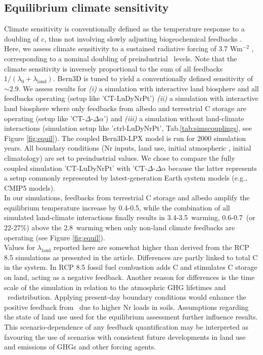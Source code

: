 \subsection{Equilibrium climate sensitivity}
\label{sec:equil}
Climate sensitivity is conventionally defined as the temperature response to a doubling of c\coo , thus not involving slowly adjusting biogeochemical feedbacks \citep{knuttihegerl08ngeo}. Here, we assess climate sensitivity to a sustained radiative forcing of 3.7 Wm$^{-2}$ , corresponding to a nominal doubling of preindustrial \coo\ levels. Note that the climate sensitivity is inversely proportional to the sum of all feedbacks $1/(\lambda_0+\lambda_{\mathrm{land}})$. Bern3D is tuned to yield a conventionally defined sensitivity of $\sim$2.9\degC . We assess results  for {\it (i)} a simulation with interactive land biosphere and all feedbacks operating (setup like 'CT-LuDyNrPt') {\it (ii)}  a simulation with interactive land biosphere where only feedbacks from albedo and terrestrial C storage are operating (setup like 'CT-$\Delta$\coo-$\Delta \alpha$') and {\it (iii)} a simulation without land-climate interactions (simulation setup like 'ctrl-LuDyNrPt', Tab.\ref{tab:simscouplings}, see Figure \ref{fig:equil}). The coupled Bern3D-LPX model is run for 2000 simulation years. All boundary conditions (Nr inputs, land use, initial atmospheric \coo, initial climatology) are set to preindustrial values. We chose to compare the fully coupled simulation 'CT-LuDyNrPt' with 'CT-$\Delta$\coo-$\Delta \alpha$ because the latter represents a setup commonly represented by latest-generation Earth system models (e.g., CMIP5 models).\\

In our simulations, feedbacks from terrestrial C storage and albedo amplify the equilibrium temperature increase by 0.4-0.5\degC , while the combination of all simulated land-climate interactions finally results in 3.4-3.5\degC\ warming, 0.6-0.7\degC\ (or 22-27\%) above the 2.8\degC\ warming when only non-land climate feedbacks are operating (see Figure \ref{fig:equil}).\\

Values for $\lambda_{\mathrm{land}}$ reported here are somewhat higher than derived from the RCP 8.5 simulations as presented in the article. Differences are partly linked to total C in the system. In RCP 8.5 fossil fuel combustion adds C and stimulates C storage on land, acting as a negative feedback. Another reason for differences is the time scale of the simulation in relation to the atmosphric GHG lifetimes and \coo\ redistribution. Applying present-day boundary conditions would enhance the positive feedback from \nno\ due to higher Nr loads in soils. Assumptions regarding the state of land use used for the equilibrium assessment further influence results. This scenario-dependence of any feedback quantification may be interpreted as favouring the use of scenarios with consistent future developments in land use and emissions of GHGs and other forcing agents.

